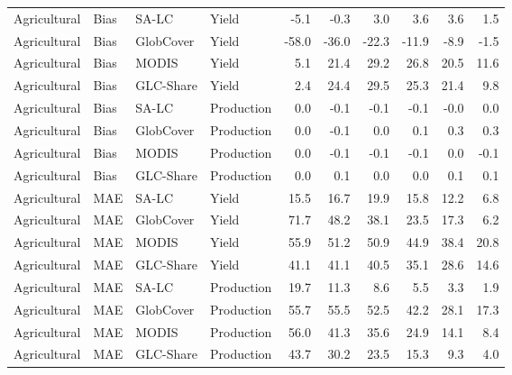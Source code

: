 \begin{longtable}{llllrrrrrr}
  Agricultural & Bias & SA-LC & Yield & -5.1 & -0.3 & 3.0 & 3.6 & 3.6 & 1.5 \\ 
  Agricultural & Bias & GlobCover & Yield & -58.0 & -36.0 & -22.3 & -11.9 & -8.9 & -1.5 \\ 
  Agricultural & Bias & MODIS & Yield & 5.1 & 21.4 & 29.2 & 26.8 & 20.5 & 11.6 \\ 
  Agricultural & Bias & GLC-Share & Yield & 2.4 & 24.4 & 29.5 & 25.3 & 21.4 & 9.8 \\ 
  Agricultural & Bias & SA-LC & Production & 0.0 & -0.1 & -0.1 & -0.1 & -0.0 & 0.0 \\ 
  Agricultural & Bias & GlobCover & Production & 0.0 & -0.1 & 0.0 & 0.1 & 0.3 & 0.3 \\ 
  Agricultural & Bias & MODIS & Production & 0.0 & -0.1 & -0.1 & -0.1 & 0.0 & -0.1 \\ 
  Agricultural & Bias & GLC-Share & Production & 0.0 & 0.1 & 0.0 & 0.0 & 0.1 & 0.1 \\ 
  Agricultural & MAE & SA-LC & Yield & 15.5 & 16.7 & 19.9 & 15.8 & 12.2 & 6.8 \\ 
  Agricultural & MAE & GlobCover & Yield & 71.7 & 48.2 & 38.1 & 23.5 & 17.3 & 6.2 \\ 
  Agricultural & MAE & MODIS & Yield & 55.9 & 51.2 & 50.9 & 44.9 & 38.4 & 20.8 \\ 
  Agricultural & MAE & GLC-Share & Yield & 41.1 & 41.1 & 40.5 & 35.1 & 28.6 & 14.6 \\ 
  Agricultural & MAE & SA-LC & Production & 19.7 & 11.3 & 8.6 & 5.5 & 3.3 & 1.9 \\ 
  Agricultural & MAE & GlobCover & Production & 55.7 & 55.5 & 52.5 & 42.2 & 28.1 & 17.3 \\ 
  Agricultural & MAE & MODIS & Production & 56.0 & 41.3 & 35.6 & 24.9 & 14.1 & 8.4 \\ 
  Agricultural & MAE & GLC-Share & Production & 43.7 & 30.2 & 23.5 & 15.3 & 9.3 & 4.0 \\ 
   \hline
\hline
\end{longtable}
